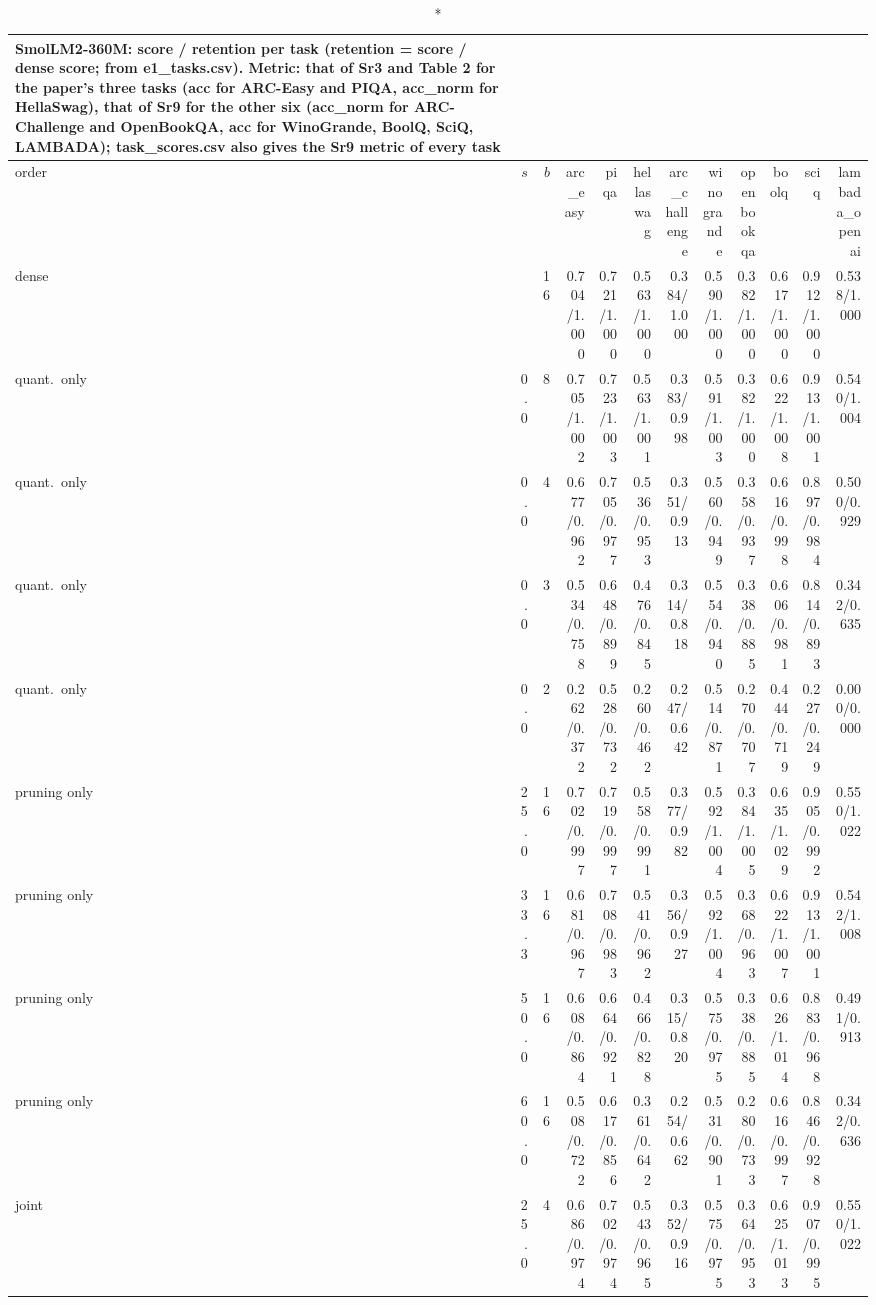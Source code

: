 \documentclass{article}
\begin{document}
\begin{longtable}{lrrrrrrrrrrr}
\caption*{SmolLM2-360M: score / retention per task (retention = score / dense score; from e1\_tasks.csv). Metric: that of Sr3 and Table 2 for the paper's three tasks (acc for ARC-Easy and PIQA, acc\_norm for HellaSwag), that of Sr9 for the other six (acc\_norm for ARC-Challenge and OpenBookQA, acc for WinoGrande, BoolQ, SciQ, LAMBADA); task\_scores.csv also gives the Sr9 metric of every task}\\
\toprule order & $s$ & $b$ & arc\_easy & piqa & hellaswag & arc\_challenge & winogrande & openbookqa & boolq & sciq & lambada\_openai \\ \midrule \endhead
dense &  & 16 & 0.704/1.000 & 0.721/1.000 & 0.563/1.000 & 0.384/1.000 & 0.590/1.000 & 0.382/1.000 & 0.617/1.000 & 0.912/1.000 & 0.538/1.000 \\
quant.\ only & 0.0 & 8 & 0.705/1.002 & 0.723/1.003 & 0.563/1.001 & 0.383/0.998 & 0.591/1.003 & 0.382/1.000 & 0.622/1.008 & 0.913/1.001 & 0.540/1.004 \\
quant.\ only & 0.0 & 4 & 0.677/0.962 & 0.705/0.977 & 0.536/0.953 & 0.351/0.913 & 0.560/0.949 & 0.358/0.937 & 0.616/0.998 & 0.897/0.984 & 0.500/0.929 \\
quant.\ only & 0.0 & 3 & 0.534/0.758 & 0.648/0.899 & 0.476/0.845 & 0.314/0.818 & 0.554/0.940 & 0.338/0.885 & 0.606/0.981 & 0.814/0.893 & 0.342/0.635 \\
quant.\ only & 0.0 & 2 & 0.262/0.372 & 0.528/0.732 & 0.260/0.462 & 0.247/0.642 & 0.514/0.871 & 0.270/0.707 & 0.444/0.719 & 0.227/0.249 & 0.000/0.000 \\
pruning only & 25.0 & 16 & 0.702/0.997 & 0.719/0.997 & 0.558/0.991 & 0.377/0.982 & 0.592/1.004 & 0.384/1.005 & 0.635/1.029 & 0.905/0.992 & 0.550/1.022 \\
pruning only & 33.3 & 16 & 0.681/0.967 & 0.708/0.983 & 0.541/0.962 & 0.356/0.927 & 0.592/1.004 & 0.368/0.963 & 0.622/1.007 & 0.913/1.001 & 0.542/1.008 \\
pruning only & 50.0 & 16 & 0.608/0.864 & 0.664/0.921 & 0.466/0.828 & 0.315/0.820 & 0.575/0.975 & 0.338/0.885 & 0.626/1.014 & 0.883/0.968 & 0.491/0.913 \\
pruning only & 60.0 & 16 & 0.508/0.722 & 0.617/0.856 & 0.361/0.642 & 0.254/0.662 & 0.531/0.901 & 0.280/0.733 & 0.616/0.997 & 0.846/0.928 & 0.342/0.636 \\
joint & 25.0 & 4 & 0.686/0.974 & 0.702/0.974 & 0.543/0.965 & 0.352/0.916 & 0.575/0.975 & 0.364/0.953 & 0.625/1.013 & 0.907/0.995 & 0.550/1.022 \\

\end{longtable}
\end{document}
